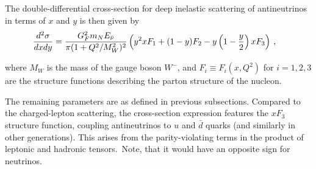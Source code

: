 The double-differential cross-section for deep inelastic scattering of antineutrinos in terms of $x$ and $y$ is then given by \cite{Thomson, RevModPhys.70.1341}
\vspace{-7pt}
\begin{equation}
    \begin{aligned}
        \frac{d^2 \sigma}{dx dy} {} & = \frac{G_F^2 m_N E_{\bar{\nu}}}{\pi (1+Q^2/M_W^2)^2} \left(y^2xF_1+ (1-y)F_2 - y\left(1-\frac{y}{2}\right)xF_3\right)\hspace{2pt},
    \end{aligned}
    \label{eq:dis}
    \vspace{-3pt}
\end{equation}

where $M_W$ is the mass of the gauge boson $W^{-}$, and $F_i \equiv F_i(x, Q^2)$ for $i = 1, 2, 3$ are the structure functions describing the parton structure of the nucleon.

The remaining parameters are as defined in previous subsections. Compared to the charged-lepton scattering, the cross-section expression features the $xF_3$ structure function, coupling antineutrinos to $u$ and $\bar{d}$ quarks (and similarly in other generations). This arises from the parity-violating terms in the product of leptonic and hadronic tensors.~Note, that it would have an opposite sign for neutrinos.

